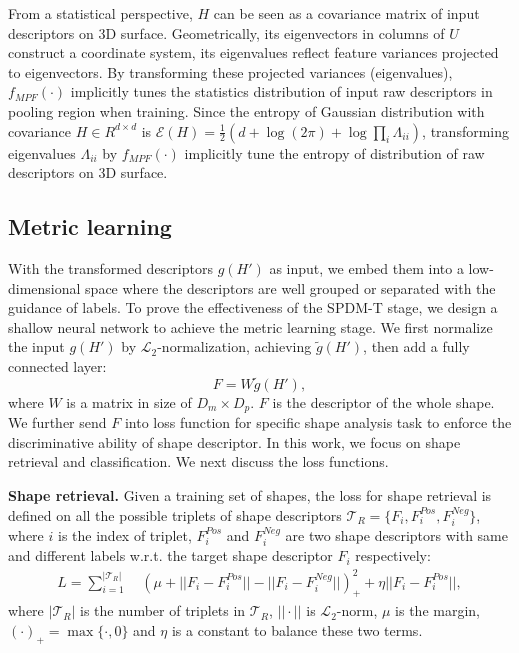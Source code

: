 \documentclass[runningheads]{llncs}
\begin{document}
From a statistical perspective,  $H$ can be seen as a covariance matrix of input descriptors on 3D surface. Geometrically, its eigenvectors in columns of $U$ construct a coordinate system, its eigenvalues reflect feature variances projected to eigenvectors.  By transforming these projected variances (eigenvalues),  $f_{MPF}(\cdot)$ implicitly tunes the statistics distribution of input raw descriptors in pooling region when training. Since the entropy of Gaussian distribution with covariance $H \in R^{d \times d}$ is $\mathcal{E}(H) = \frac{1}{2}(d + \log(2\pi) + \log\prod_{i}{\Lambda}_{ii})$, transforming eigenvalues ${\Lambda}_{ii}$ by $f_{MPF}(\cdot)$  implicitly tune the entropy of distribution of raw descriptors on 3D surface. 


\subsection{Metric learning}

With the transformed descriptors $g(H')$ as input, we embed them into a low-dimensional space where the descriptors are well grouped or separated with the guidance of labels. To prove the effectiveness of the SPDM-T stage, we design a shallow neural network to achieve the metric learning stage. We first normalize the input $g(H')$  by $\mathcal{L}_2$-normalization, achieving $\tilde{g}(H')$, then add a fully connected layer:
\begin{equation}
F = W \tilde{g}(H'),
\end{equation}
where $W$ is a matrix in size of $D_m \times D_p$. $F$ is the descriptor of the whole shape. We further send $F$ into loss function for specific shape analysis task to enforce the discriminative ability of shape descriptor.  In this work, we focus on shape retrieval and classification. 
We next discuss the loss functions. 

\noindent
\textbf{Shape retrieval.} Given a training set of shapes, the loss for shape retrieval is defined on all the possible triplets of shape descriptors $\mathcal{T}_R=\{F_i, F_i^{Pos}, F_i^{Neg}\}$, where $i$ is the index of  triplet, $F_i^{Pos}$ and $F_i^{Neg}$ are two shape descriptors with same and different labels w.r.t. the target shape descriptor $F_i$ respectively:
\begin{equation}
\begin{split}
L = \sum_{i=1}^{|\mathcal{T}_R|}~&(\mu + ||F_i - F_i^{Pos}|| - ||F_i - F_i^{Neg}||)_{+}^2
+\eta||F_i - F_i^{Pos}||,
\end{split}
\end{equation}
where $|\mathcal{T}_R|$ is the number of triplets in $\mathcal{T}_R$, $||\cdot||$ is $\mathcal{L}_2$-norm, $\mu$ is the margin, $(\cdot)_+ = \max\{\cdot,0\}$ and $\eta$ is a constant to balance these two terms.
\end{document}
